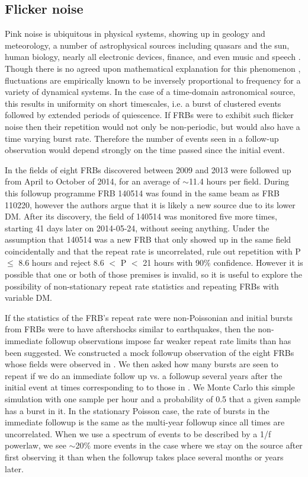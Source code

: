 \documentclass[useAMS,usenatbib]{mn2e}
\begin{document}
\subsection{Flicker noise}

Pink noise is ubiquitous in physical systems, showing up in 
geology and meteorology, a number 
of astrophysical sources including quasars and the sun, 
human biology, nearly all electronic devices, finance, 
and even music and speech
\citep{1978ComAp...7..103P, 1975Natur.258..317V}.
Though there is no agreed upon
mathematical explanation for this phenomenon
 \citep{2002physics...4033M}, fluctuations 
are empirically known to be inversely proportional to frequency 
for a variety of dynamical systems.
In the case of a time-domain astronomical 
source, this results in uniformity on short timescales, i.e. a burst of 
clustered events followed by extended periods of quiescence. 
If FRBs were to exhibit such flicker noise then their repetition would 
not only be non-periodic, but would also have a time varying 
burst rate. Therefore the number of events
seen in a follow-up observation would depend strongly on 
the time passed since the initial event.

In \cite{2015MNRAS.454..457P}
the fields of eight FRBs discovered between 2009 and 2013
were followed up from April to October of 2014, for an average 
of $\sim$11.4 hours per field. During this followup programme 
FRB 140514 was found in the same beam as FRB 110220, however
the authors argue that it is likely a new source due to its lower DM. 
After its discovery, the field of 140514 was monitored 
five more times, starting 41 days later on 2014-05-24, without seeing anything.
Under the assumption that 140514 was a new FRB 
that only showed up in the same field 
coincidentally and that the repeat rate is uncorrelated,
 \cite{2015MNRAS.454..457P} rule out repetition with P $\le$ 8.6 
hours and reject 8.6 $<$ P $<$ 21 hours with 90$\%$ confidence.
However it is possible that one or both of those premises 
is invalid, so it is useful to explore the possibility of non-stationary 
repeat rate statistics and repeating FRBs with variable DM. 

If the statistics of the FRB's repeat rate were
non-Poissonian and initial bursts from FRBs were to have aftershocks
similar to earthquakes, then the non-immediate followup observations 
impose far weaker repeat rate limits than has been suggested. We 
constructed a mock followup observation of the eight FRBs whose
fields were observed in \cite{2015MNRAS.454..457P}. We then 
asked how many bursts are seen to repeat if we do an immediate
follow up vs. a followup several years after the initial event 
at times corresponding to 
to those in \cite{2015MNRAS.454..457P}. We Monte Carlo this 
simple simulation with one sample per hour and a probability of 0.5 
that a given sample has a burst in it. 
In the stationary Poisson case, the rate of bursts in 
the immediate followup is the same as the multi-year followup 
since all times are 
uncorrelated. When we use a spectrum of events to be described by 
a 1/f powerlaw, we see $\sim$20$\%$ more events in the case where we
stay on the source after first observing it than when the followup takes 
place several months or years later.
\end{document}
